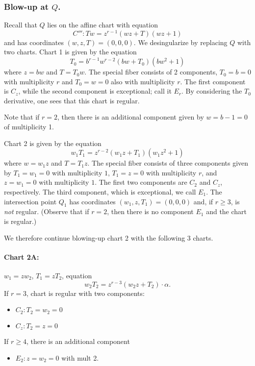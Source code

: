 \documentclass{article}
\theoremstyle{plain}
\theoremstyle{definition}
\theoremstyle{remark}
\begin{document}
\subsubsection{Blow-up at $Q$.}
\label{sec:blow-up-Q}

Recall that $Q$ lies on the affine chart with equation
\begin{equation}
  C''':Tw = z^{r-1}(wz + T)(wz + 1)\label{eq:C'''}
\end{equation}
and has coordinates $(w,z,T) = (0,0,0)$. We desingularize by replacing $Q$ with two charts. Chart 1 is given by the equation
\[
T_0 = b^{r-1}w^{r-2}(bw + T_0)(bw^2 + 1)
\]
where $z = bw$ and $T = T_0w$. The special fiber consists of 2 components, $T_0 = b = 0$ with multiplicity $r$ and $T_0 = w = 0$ also with multiplicity $r$. The first component is $C_z$, while the second component is exceptional; call it $E_r$. By considering the $T_0$ derivative, one sees that this chart is regular.

Note that if $r = 2$, then there is an additional component given by $w = b - 1 = 0$ of multiplicity 1.

Chart 2 is given by the equation
\[
w_1 T_1 = z^{r-2}(w_1z + T_1)(w_1 z^2 + 1)
\]
where $w = w_1 z$ and $T = T_1 z$. The special fiber consists of three components given by $T_1 = w_1 = 0$ with multiplicity $1$, $T_1 = z = 0$ with multiplicity $r$, and $z = w_1 = 0$ with multiplicity $1$. The first two components are $C_2$ and $C_z$, respectively. The third component, which is exceptional, we call $E_1$. The intersection point $Q_1$ has coordinates $(w_1, z, T_1) = (0,0,0)$ and, if $r \geq 3$, is \emph{not} regular. (Observe that if $r = 2$, then there is no component $E_1$ and the chart is regular.)

We therefore continue blowing-up chart 2 with the following 3 charts.

\paragraph{Chart 2A:}
\label{sec:chart-a}

$w_1 = z w_2$, $T_1 = z T_2$, equation 
\[
w_2T_2 = z^{r-3}(w_2 z + T_2) \cdot \alpha.
\]
If $r = 3$, chart is regular with two components:
\begin{itemize}
    \item $C_2: T_2 = w_2 = 0$
    \item $C_z: T_2 = z = 0$
\end{itemize}
If $r \geq 4$, there is an additional component
\begin{itemize}
    \item $E_2: z = w_2 = 0$ with mult 2.
\end{itemize}
\end{document}
